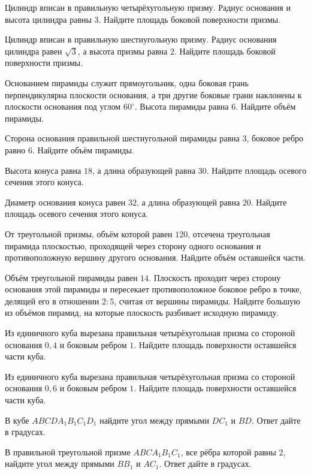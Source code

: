 
Цилиндр вписан в правильную четырёхугольную призму. Радиус основания и высота
цилиндра равны \(3\). Найдите площадь боковой поверхности призмы.

Цилиндр вписан в правильную шестиугольную призму. Радиус основания цилиндра
равен \(\sqrt{3}\), а высота призмы равна \(2\). Найдите площадь боковой
поверхности призмы.

Основанием пирамиды служит прямоугольник, одна боковая грань перпендикулярна
плоскости основания, а три другие боковые грани наклонены к плоскости основания
под углом \(60^\circ\). Высота пирамиды равна \(6\). Найдите объём пирамиды.

Сторона основания правильной шестиугольной пирамиды равна \(3\), боковое ребро
равно \(6\). Найдите объём пирамиды.

Высота конуса равна \(18\), а длина образующей равна \(30\). Найдите площадь
осевого сечения этого конуса.

Диаметр основания конуса равен \(32\), а длина образующей равна \(20\). Найдите
площадь осевого сечения этого конуса.

От треугольной призмы, объём которой равен \(120\), отсечена треугольная
пирамида плоскостью, проходящей через сторону одного основания и противоположную
вершину другого основания. Найдите объём оставшейся части.

Объём треугольной пирамиды равен \(14\). Плоскость проходит через сторону
основания этой пирамиды и пересекает противоположное боковое ребро в точке,
делящей его в отношении \(2:5\), считая от вершины пирамиды. Найдите большую из
объёмов пирамид, на которые плоскость разбивает исходную пирамиду.

Из единичного куба вырезана правильная четырёхугольная призма со стороной
основания \(0{,}4\) и боковым ребром \(1\). Найдите площадь поверхности
оставшейся части куба.

Из единичного куба вырезана правильная четырёхугольная призма со стороной
основания \(0{,}6\) и боковым ребром \(1\). Найдите площадь поверхности
оставшейся части куба.

В кубе \(ABCDA_1B_1C_1D_1\) найдите угол между прямыми \(DC_1\) и \(BD\).
Ответ дайте в градусах.

В правильной треугольной призме \(ABCA_1B_1C_1\), все рёбра которой равны
\(2\), найдите угол между прямыми \(BB_1\) и \(AC_1\). Ответ дайте в градусах.

